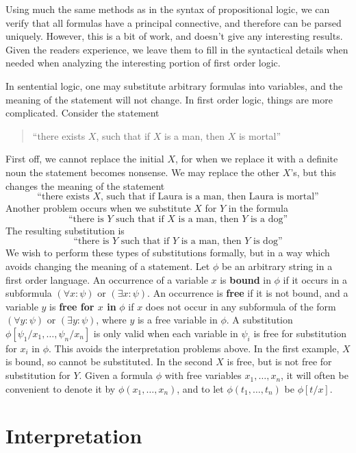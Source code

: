 Using much the same methods as in the syntax of propositional logic, we can verify that all formulas have a principal connective, and therefore can be parsed uniquely. However, this is a bit of work, and doesn't give any interesting results. Given the readers experience, we leave them to fill in the syntactical details when needed when analyzing the interesting portion of first order logic.

In sentential logic, one may substitute arbitrary formulas into variables, and the meaning of the statement will not change. In first order logic, things are more complicated. Consider the statement
%
\begin{quotation}
    ``there exists $X$, such that if $X$ is a man, then $X$ is mortal''
\end{quotation}
%
First off, we cannot replace the initial $X$, for when we replace it with a definite noun the statement becomes nonsense. We may replace the other $X$'s, but this changes the meaning of the statement
%
\[ \text{``there exists $X$, such that if Laura is a man, then Laura is mortal''} \]
%
Another problem occurs when we substitute $X$ for $Y$ in the formula
%
\[ \text{``there is $Y$ such that if $X$ is a man, then $Y$ is a dog''} \]
%
The resulting substitution is
%
\[ \text{``there is $Y$ such that if $Y$ is a man, then $Y$ is dog''} \]
%
We wish to perform these types of substitutions formally, but in a way which avoids changing the meaning of a statement. Let $\phi$ be an arbitrary string in a first order language. An occurrence of a variable $x$ is {\bf bound} in $\phi$ if it occurs in a subformula $(\forall x: \psi)$ or $(\exists x: \psi)$. An occurrence is {\bf free} if it is not bound, and a variable $y$ is {\bf free for $x$ in} $\phi$ if $x$ does not occur in any subformula of the form $(\forall y: \psi)$ or $(\exists y: \psi)$, where $y$ is a free variable in $\phi$. A substitution $\phi[\psi_1/x_1, \dots, \psi_n/x_n]$ is only valid when each variable in $\psi_i$ is free for substitution for $x_i$ in $\phi$. This avoids the interpretation problems above. In the first example, $X$ is bound, so cannot be substituted. In the second $X$ is free, but is not free for substitution for $Y$. Given a formula $\phi$ with free variables $x_1, \dots, x_n$, it will often be convenient to denote it by $\phi(x_1, \dots, x_n)$, and to let $\phi(t_1, \dots, t_n)$ be $\phi[t/x]$.

\section{Interpretation}

